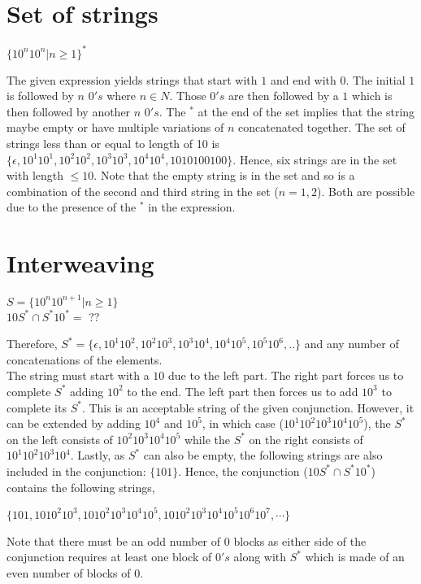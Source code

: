 \documentclass[11pt,letterpaper]{article}
\begin{document}
\section{Set of strings}
\begin{center} $\{10^n10^n | n \geq 1\}^*$ \end{center}
The given expression yields strings that start with $1$ and end with $0$. The initial $1$ is followed by $n$ $0's$ where $n \in N$. Those $0's$ are then followed by a $1$ which is then followed by another $n$ $0's$. The $^*$ at the end of the set implies that the string maybe empty or have multiple variations of $n$ concatenated together.
The set of strings less than or equal to length of 10 is $\{\epsilon, 10^{1}10^{1}, 10^{2}10^{2}, 10^{3}10^{3}, 10^{4}10^{4}, 1010100100\}$. Hence, six strings are in the set with length $\leq 10$. Note that the empty string is in the set and so is a combination of the second and third string in the set ($n=1,2$). Both are possible due to the presence of the $^*$ in the expression.

\section{Interweaving}
\begin{center}
    $S = \{10^{n}10^{n+1}|n \geq 1\}$
    \\
    $10S^{*} \cap S^{*}10^{*} =$ ??
\end{center}
Therefore, $S^{*} = \{\epsilon, 10^{1}10^{2}, 10^{2}10^{3}, 10^{3}10^{4}, 10^{4}10^{5}, 10^{5}10^{6}, ..\}$ and any number of concatenations of the elements.
\\
The string must start with a $10$ due to the left part. The right part forces us to complete $S^*$ adding $10^{2}$ to the end. The left part then forces us to add $10^{3}$ to complete its $S^*$. This is an acceptable string of the given conjunction. However, it can be extended by adding $10^{4}$ and $10^{5}$, in which case ($10^{1}10^{2}10^{3}10^{4}10^{5}$), the $S^*$ on the left consists of $10^{2}10^{3}10^{4}10^{5}$ while the $S^*$ on the right consists of $10^{1}10^{2}10^{3}10^{4}$. Lastly, as $S^*$ can also be empty, the following strings are also included in the conjunction: $\{101\}$. Hence, the conjunction ($10S^{*} \cap S^{*}10^{*}$) contains the following strings,
\begin{center}
    $\{101, 1010^{2}10^{3}, 1010^{2}10^{3}10^{4}10^{5}, 1010^{2}10^{3}10^{4}10^{5}10^{6}10^{7}, \cdots\}$
\end{center}
Note that there must be an odd number of $0$ blocks as either side of the conjunction requires at least one block of $0's$ along with $S^*$ which is made of an even number of blocks of $0$.
\end{document}
